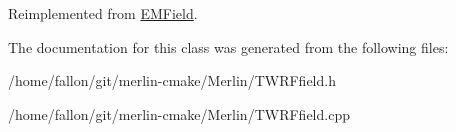 Reimplemented from \hyperlink{classEMField_aa00f4f213a55c9223f6ca08463a57691}{E\+M\+Field}.



The documentation for this class was generated from the following files\+:\begin{DoxyCompactItemize}
\item 
/home/fallon/git/merlin-\/cmake/\+Merlin/T\+W\+R\+Ffield.\+h\item 
/home/fallon/git/merlin-\/cmake/\+Merlin/T\+W\+R\+Ffield.\+cpp\end{DoxyCompactItemize}
